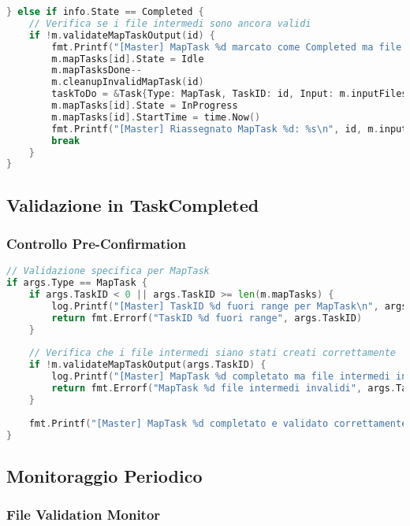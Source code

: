 \documentclass[12pt,a4paper]{article}
\begin{document}
\begin{lstlisting}[language=go]
} else if info.State == Completed {
    // Verifica se i file intermedi sono ancora validi
    if !m.validateMapTaskOutput(id) {
        fmt.Printf("[Master] MapTask %d marcato come Completed ma file intermedi invalidi, resetto a Idle\n", id)
        m.mapTasks[id].State = Idle
        m.mapTasksDone--
        m.cleanupInvalidMapTask(id)
        taskToDo = &Task{Type: MapTask, TaskID: id, Input: m.inputFiles[id], NReduce: m.nReduce}
        m.mapTasks[id].State = InProgress
        m.mapTasks[id].StartTime = time.Now()
        fmt.Printf("[Master] Riassegnato MapTask %d: %s\n", id, m.inputFiles[id])
        break
    }
}
\end{lstlisting}

\subsection{Validazione in TaskCompleted}

\subsubsection{Controllo Pre-Confirmation}

\begin{lstlisting}[language=go]
// Validazione specifica per MapTask
if args.Type == MapTask {
    if args.TaskID < 0 || args.TaskID >= len(m.mapTasks) {
        log.Printf("[Master] TaskID %d fuori range per MapTask\n", args.TaskID)
        return fmt.Errorf("TaskID %d fuori range", args.TaskID)
    }
    
    // Verifica che i file intermedi siano stati creati correttamente
    if !m.validateMapTaskOutput(args.TaskID) {
        log.Printf("[Master] MapTask %d completato ma file intermedi invalidi, rifiuto completamento\n", args.TaskID)
        return fmt.Errorf("MapTask %d file intermedi invalidi", args.TaskID)
    }
    
    fmt.Printf("[Master] MapTask %d completato e validato correttamente\n", args.TaskID)
}
\end{lstlisting}

\subsection{Monitoraggio Periodico}

\subsubsection{File Validation Monitor}
\end{document}
